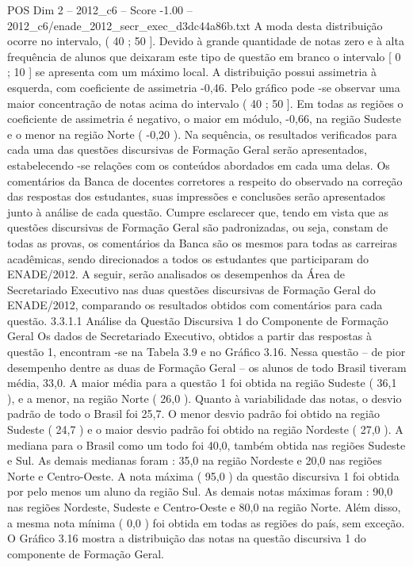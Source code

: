 \begin{textsample}{POS Dim 2 – 2012\_c6 – Score -1.00 – 2012\_c6/enade\_2012\_secr\_exec\_d3dc44a86b.txt}
A moda desta distribuição ocorre no intervalo, ( 40 ; 50 ].
Devido à grande quantidade de notas zero e à alta frequência de alunos que deixaram este tipo de questão em branco o intervalo [ 0 ; 10 ] se apresenta com um máximo local.
A distribuição possui assimetria à esquerda, com coeficiente de assimetria -0,46.
Pelo gráfico pode -se observar uma maior concentração de notas acima do intervalo ( 40 ; 50 ].
Em todas as regiões o coeficiente de assimetria é negativo, o maior em módulo, -0,66, na região Sudeste e o menor na região Norte ( -0,20 ).
Na sequência, os resultados verificados para cada uma das questões discursivas de Formação Geral serão apresentados, estabelecendo -se relações com os conteúdos abordados em cada uma delas.
Os comentários da Banca de docentes corretores a respeito do observado na correção das respostas dos estudantes, suas impressões e conclusões serão apresentados junto à análise de cada questão.
Cumpre esclarecer que, tendo em vista que as questões discursivas de Formação Geral são padronizadas, ou seja, constam de todas as provas, os comentários da Banca são os mesmos para todas as carreiras acadêmicas, sendo direcionados a todos os estudantes que participaram do ENADE/2012.
A seguir, serão analisados os desempenhos da Área de Secretariado Executivo nas duas questões discursivas de Formação Geral do ENADE/2012, comparando os resultados obtidos com comentários para cada questão. 3.3.1.1 Análise da Questão Discursiva 1 do Componente de Formação Geral Os dados de Secretariado Executivo, obtidos a partir das respostas à questão 1, encontram -se na Tabela 3.9 e no Gráfico 3.16.
Nessa questão – de pior desempenho dentre as duas de Formação Geral – os alunos de todo Brasil tiveram média, 33,0.
A maior média para a questão 1 foi obtida na região Sudeste ( 36,1 ), e a menor, na região Norte ( 26,0 ).
Quanto à variabilidade das notas, o desvio padrão de todo o Brasil foi 25,7.
O menor desvio padrão foi obtido na região Sudeste ( 24,7 ) e o maior desvio padrão foi obtido na região Nordeste ( 27,0 ).
A mediana para o Brasil como um todo foi 40,0, também obtida nas regiões Sudeste e Sul.
As demais medianas foram : 35,0 na região Nordeste e 20,0 nas regiões Norte e Centro-Oeste.
A nota máxima ( 95,0 ) da questão discursiva 1 foi obtida por pelo menos um aluno da região Sul.
As demais notas máximas foram : 90,0 nas regiões Nordeste, Sudeste e Centro-Oeste e 80,0 na região Norte.
Além disso, a mesma nota mínima ( 0,0 ) foi obtida em todas as regiões do país, sem exceção.
O Gráfico 3.16 mostra a distribuição das notas na questão discursiva 1 do componente de Formação Geral.

\end{textsample}
